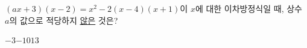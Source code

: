 $(ax+3)(x-2)=x^2-2(x-4)(x+1)$이 $x$에 대한 이차방정식일 때, 상수 $a$의 값으로 적당하지 \underline{않은} 것은?
\begin{choices32}{$-3$}{$-1$}{$0$}{$1$}{$3$}\end{choices32}
